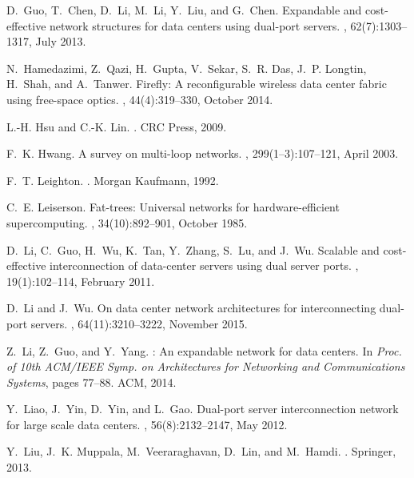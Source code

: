 \documentclass[]{amsart}
\begin{document}
{\begin{thebibliography}{10}
D.~Guo, T.~Chen, D.~Li, M.~Li, Y.~Liu, and G.~Chen.
\newblock Expandable and cost-effective network structures for data centers
  using dual-port servers.
, 62(7):1303--1317, July 2013.

N.~Hamedazimi, Z.~Qazi, H.~Gupta, V.~Sekar, S.~R. Das, J.~P. Longtin, H.~Shah,
  and A.~Tanwer.
\newblock Firefly: A reconfigurable wireless data center fabric using
  free-space optics.
, 44(4):319--330, October
  2014.

L.-H. Hsu and C.-K. Lin.
.
\newblock CRC Press, 2009.

F.~K. Hwang.
\newblock A survey on multi-loop networks.
, 299(1--3):107--121, April 2003.

F.~T. Leighton.
.
\newblock Morgan Kaufmann, 1992.

C.~E. Leiserson.
\newblock Fat-trees: Universal networks for hardware-efficient supercomputing.
, 34(10):892--901, October 1985.

D.~Li, C.~Guo, H.~Wu, K.~Tan, Y.~Zhang, S.~Lu, and J.~Wu.
\newblock Scalable and cost-effective interconnection of data-center servers
  using dual server ports.
, 19(1):102--114, February
  2011.

D.~Li and J.~Wu.
\newblock On data center network architectures for interconnecting dual-port
  servers.
, 64(11):3210--3222, November
  2015.

Z.~Li, Z.~Guo, and Y.~Yang.
: An expandable network for data centers.
\newblock In {\em Proc. of 10th ACM/IEEE Symp. on Architectures for Networking
  and Communications Systems}, pages 77--88. ACM, 2014.

Y.~Liao, J.~Yin, D.~Yin, and L.~Gao.
 {D}ual-port server interconnection network for large scale
  data centers.
, 56(8):2132--2147, May 2012.

Y.~Liu, J.~K. Muppala, M.~Veeraraghavan, D.~Lin, and M.~Hamdi.
.
\newblock Springer, 2013.


\end{thebibliography}}
\end{document}
